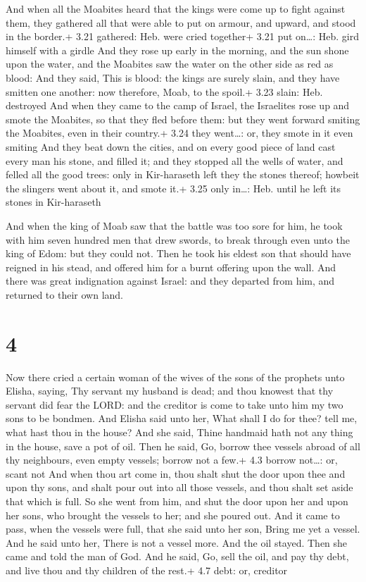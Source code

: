  And when all the Moabites heard that the kings were come
up to fight against them, they gathered all that were able to put on
armour, and upward, and stood in the border.+ 3.21 gathered: Heb. were
cried together+ 3.21 put on\ldots: Heb. gird himself with a girdle
 And they rose up early in the morning, and the sun shone
upon the water, and the Moabites saw the water on the other side as red
as blood:  And they said, This is blood: the kings are
surely slain, and they have smitten one another: now therefore, Moab, to
the spoil.+ 3.23 slain: Heb. destroyed  And when they came
to the camp of Israel, the Israelites rose up and smote the Moabites, so
that they fled before them: but they went forward smiting the Moabites,
even in their country.+ 3.24 they went\ldots: or, they smote in it even
smiting  And they beat down the cities, and on every good
piece of land cast every man his stone, and filled it; and they stopped
all the wells of water, and felled all the good trees: only in
Kir-haraseth left they the stones thereof; howbeit the slingers went
about it, and smote it.+ 3.25 only in\ldots: Heb. until he left its
stones in Kir-haraseth

 And when the king of Moab saw that the battle was too
sore for him, he took with him seven hundred men that drew swords, to
break through even unto the king of Edom: but they could not.
 Then he took his eldest son that should have reigned in
his stead, and offered him for a burnt offering upon the wall. And there
was great indignation against Israel: and they departed from him, and
returned to their own land.

\hypertarget{section-3}{%
\section{4}\label{section-3}}

 Now there cried a certain woman of the wives of the sons of
the prophets unto Elisha, saying, Thy servant my husband is dead; and
thou knowest that thy servant did fear the LORD: and the creditor is
come to take unto him my two sons to be bondmen.  And Elisha
said unto her, What shall I do for thee? tell me, what hast thou in the
house? And she said, Thine handmaid hath not any thing in the house,
save a pot of oil.  Then he said, Go, borrow thee vessels
abroad of all thy neighbours, even empty vessels; borrow not a few.+ 4.3
borrow not\ldots: or, scant not  And when thou art come in,
thou shalt shut the door upon thee and upon thy sons, and shalt pour out
into all those vessels, and thou shalt set aside that which is full.
 So she went from him, and shut the door upon her and upon
her sons, who brought the vessels to her; and she poured out.
 And it came to pass, when the vessels were full, that she
said unto her son, Bring me yet a vessel. And he said unto her, There is
not a vessel more. And the oil stayed.  Then she came and
told the man of God. And he said, Go, sell the oil, and pay thy debt,
and live thou and thy children of the rest.+ 4.7 debt: or, creditor

